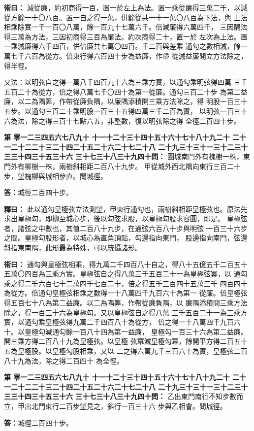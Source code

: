 \documentclass[11pt,a4paper]{article}
\newcounter{probnum}
\newcommand{\chnum}[1]{%
  \ifcase#1 零\or 一\or 二\or 三\or 四\or 五\or 六\or 七\or 八\or 九\or 十\or
    十一\or 十二\or 十三\or 十四\or 十五\or 十六\or 十七\or 十八\or 十九\or 二十\or
    二十一\or 二十二\or 二十三\or 二十四\or 二十五\or 二十六\or 二十七\or 二十八\or
    二十九\or 三十\or 三十一\or 三十二\or 三十三\or 三十四\or 三十五\or 三十六\or
    三十七\or 三十八\or 三十九\or 四十\fi}
\newcommand{\problem}[1]{\stepcounter{probnum}\par\noindent\textbf{第\chnum{\value{probnum}}問：}#1\par}
\newcommand{\answer}[1]{\par\noindent\textbf{答：}#1\par}
\newcommand{\shiyi}[1]{\par\noindent\textbf{釋曰：}#1\par}
\newcommand{\shuyue}[1]{\par\noindent\textbf{術曰：}#1\par}
\begin{document}
\shuyue{
減從廉，約初商得一百，置一於左上為法。置一乘從廉得三萬二千，以減
從方餘一十〇八百。置一自之得一萬，併餘從共一十一萬〇八百為下法，與
上法相乘除實一千一百〇八萬，餘一百九十七萬六千。倍減廉得六萬四千，
三因隅法得三萬為方法，三因初商得三百為廉法。約次商得二十，置一於
左次為上法。置一乘減廉得六千四百，併倍廉共七萬〇四百。千二百與差乘
通勾之數相減，餘一萬七千六百為從方。倍東行得六百四十步為益廉，作帶
從減益廉開立方法除之，得半徑。

又法：以明弦自之得一萬八千四百九十六為三乘方實，以通勾乘明弦得四萬
三千五百二十為從方，倍之得八萬七千〇四十為第一從廉。通勾三百二十步
為第二益廉，以二為隅筭，作帶從廉負隅，以廉隅添積開三乘方法除之，得
明股一百三十五步。以通勾三百二十乘明股一百三十五得四萬三千二百為實，
以明弦一百三十六為法，除之得三百十七點六五，非整數，復以明弦除之得
全徑二百四十步。
}

\vspace{0.3cm}
\problem{
圓城南門外有槐樹一株，東門外有柳樹一株，兩樹斜相距二百八十九步。
甲從城外西北隅向東行三百二十步，望槐柳與城相參直。問城徑。
}

\answer{城徑二百四十步。}

\shiyi{
此以通勾皇極弦立法測望，甲東行通勾也，兩樹斜相距皇極弦也。原法先
求出皇極勾，即柳至城心步，後以勾弦求股，以皇極勾股求容圓，即是。
皇極弦者，諸弦之中數也，其值二百八十九步，在通弦六百八十步與明弦
一百三十六步之間。皇極勾股形者，以城心為直角頂點，勾邊指向東門，
股邊指向南門，弦邊斜指東南隅，此形最為特殊，可以統攝諸形。
}

\shuyue{
通勾與皇極弦相乘，得九萬二千四百八十自之，得八十五億五千二百五十
五萬〇四百為三乘方實。皇極弦自之得八萬三千五百二十一為皇極弦冪，以
通勾乘之得二千六百七十二萬四千七百二十，倍之得五千三百四十五萬三千
四百四十為從方。倍通勾皇極弦相乘之數得一十八萬四千九百六十為第一
從廉。倍皇極弦得五百七十八為第二益廉。以二為隅筭，作帶從廉負隅，以
廉隅添積開三乘方法除之，得一百三十六為皇極勾。又以皇極弦自之得八萬
三千五百二十一為三乘方實，以通勾乘皇極弦得九萬二千四百八十為從方，
倍之得一十八萬四千九百六十。以皇極勾減通勾餘一百八十四為第一益廉，
皇極勾一百三十六為第二益廉。開三乘方得二百八十九為皇極弦。以皇極
弦冪減皇極勾冪，餘開平方得二百五十五為皇極股。以皇極勾股相乘，又以
二之得六萬九千三百六十為實，皇極弦二百八十九為法，除之得二百四十
為全徑。
}

\vspace{0.3cm}
\problem{
乙出東門南行不知步數而立，甲出北門東行二百步望見之，斜行一百三十六
步與乙相會。問城徑。
}

\answer{城徑二百四十步。}
\end{document}
